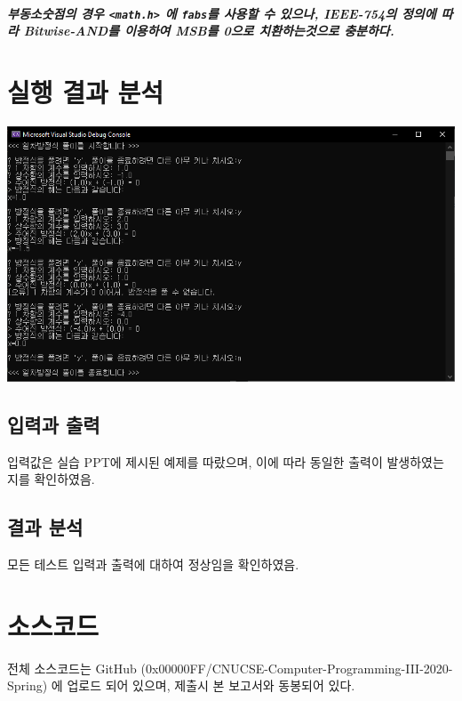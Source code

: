 \documentclass{article}
\begin{document}
    \subparagraph{ 부동소숫점의 경우 \texttt{<math.h>} 에 \texttt{fabs}를 사용할 수 있으나, IEEE-754의 정의에 따라 Bitwise-AND를 이용하여 MSB를 0으로 치환하는것으로 충분하다.}

    \section{실행 결과 분석}

    \includegraphics[width=\textwidth]{test_result.png}

    \subsection{입력과 출력}

    입력값은 실습 PPT에 제시된 예제를 따랐으며, 이에 따라 동일한 출력이 발생하였는 지를 확인하였음.

    \subsection{결과 분석}

    모든 테스트 입력과 출력에 대하여 정상임을 확인하였음. 
    
    \section{소스코드}
    전체 소스코드는 GitHub (0x00000FF/CNUCSE-Computer-Programming-III-2020-Spring) 에 업로드 되어 있으며, 제출시 본 보고서와 동봉되어 있다.
\end{document}
